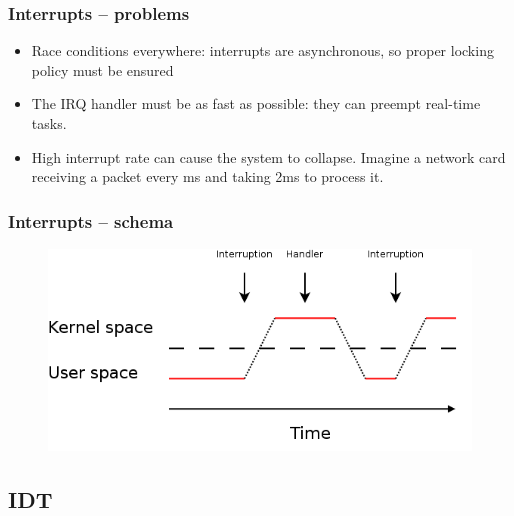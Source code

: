 \documentclass{beamer}
\begin{document}
\begin{frame}
  \frametitle{Interrupts -- problems}

  \begin{itemize}
  \item
    Race conditions everywhere: interrupts are asynchronous, so proper locking policy must be ensured
  \item
    The IRQ handler must be as fast as possible: they can preempt real-time tasks.
  \item
    High interrupt rate can cause the system to collapse. Imagine a network card receiving a packet every ms and taking 2ms to process it.
  \end{itemize}
\end{frame}

\begin{frame}
  \frametitle{Interrupts -- schema}

  \begin{figure}
  \includegraphics[scale=0.38]{interrupts.png}
  \end{figure}
\end{frame}

\subsection{IDT}
\end{document}
